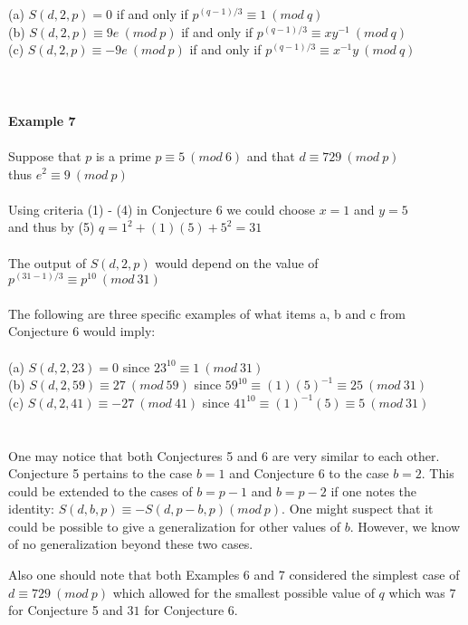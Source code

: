 \documentclass[final,letterpaper,oneside,10pt]{article}
\begin{document}
\\
\\
(a) $S(d,2,p) = 0$ if and only if $p^{(q-1)/3} \equiv 1~(mod~q)$
\\
(b) $S(d,2,p) \equiv 9e~(mod~p)$  if and only if $p^{(q-1)/3} \equiv xy^{-1}~(mod~q)$
\\
(c) $S(d,2,p) \equiv -9e~(mod~p)$  if and only if $p^{(q-1)/3} \equiv x^{-1}y~(mod~q)$
\\
\\
\\
\\
\textbf{Example 7}
\\
\\
Suppose that $p$ is a prime $p \equiv 5~(mod~6)$ and that $d \equiv 729~(mod~p)$ 
\\
thus $e^2 \equiv 9~(mod~p)$
\\
\\
Using criteria (1) - (4) in Conjecture 6 we could choose $x=1$ and $y=5$
\\
and thus by (5) $q = 1^2 + (1)(5) + 5^2 = 31$
\\
\\
The output of $S(d,2,p)$ would depend on the value of $p^{(31-1)/3} \equiv p^{10}~(mod~31)$
\\
\\
The following are three specific examples of what items a, b and c from Conjecture 6 would imply:
\\
\\
(a) $S(d,2,23) = 0$ since $23^{10} \equiv  1~(mod~31)$
\\
(b) $S(d,2,59) \equiv 27~(mod~59)$ since $59^{10} \equiv (1)(5)^{-1} \equiv 25~(mod~31)$
\\
(c) $S(d,2,41) \equiv -27~(mod~41)$ since $41^{10} \equiv (1)^{-1}(5) \equiv 5~(mod~31)$
\\
\\
\\
One may notice that both Conjectures 5 and 6 are very similar to each other.  Conjecture 5 pertains to the case $b=1$ and Conjecture 6 to the 
case $b=2$.  This could be extended to the cases of $b=p-1$ and $b=p-2$ if one notes the identity: $S(d,b,p) \equiv -S(d,p-b,p)(mod~p)$.
One might suspect that it could be possible to give a generalization for other values of $b$.  However, we know of no generalization  
beyond these two cases.

Also one should note that both Examples 6 and 7 considered the simplest case of $d \equiv 729~(mod~p)$ which allowed for the smallest possible 
value of $q$ which was $7$ for Conjecture 5 and $31$ for Conjecture 6.
\\
\end{document}
